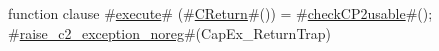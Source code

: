 function clause #\hyperref[zexecute]{execute}# (#\hyperref[zCReturn]{CReturn}#()) =
{
  #\hyperref[zcheckCPtwousable]{checkCP2usable}#();
  #\hyperref[zraisezyctwozyexceptionzynoreg]{raise\_c2\_exception\_noreg}#(CapEx_ReturnTrap)
}
